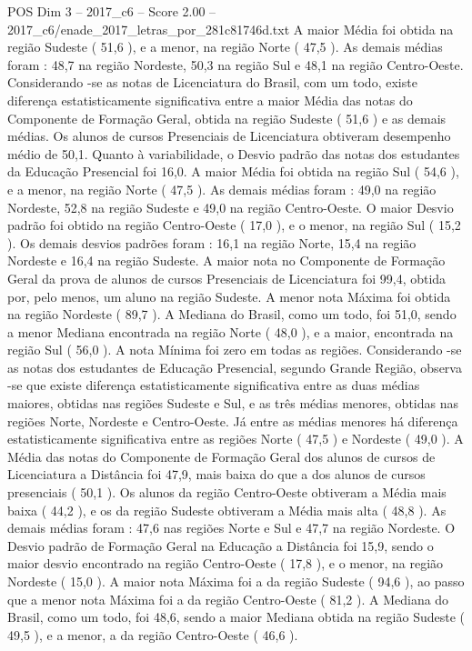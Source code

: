 \begin{textsample}{POS Dim 3 – 2017\_c6 – Score 2.00 – 2017\_c6/enade\_2017\_letras\_por\_281c81746d.txt}
A maior Média foi obtida na região Sudeste ( 51,6 ), e a menor, na região Norte ( 47,5 ).
As demais médias foram : 48,7 na região Nordeste, 50,3 na região Sul e 48,1 na região Centro-Oeste.
Considerando -se as notas de Licenciatura do Brasil, com um todo, existe diferença estatisticamente significativa entre a maior Média das notas do Componente de Formação Geral, obtida na região Sudeste ( 51,6 ) e as demais médias.
Os alunos de cursos Presenciais de Licenciatura obtiveram desempenho médio de 50,1.
Quanto à variabilidade, o Desvio padrão das notas dos estudantes da Educação Presencial foi 16,0.
A maior Média foi obtida na região Sul ( 54,6 ), e a menor, na região Norte ( 47,5 ).
As demais médias foram : 49,0 na região Nordeste, 52,8 na região Sudeste e 49,0 na região Centro-Oeste.
O maior Desvio padrão foi obtido na região Centro-Oeste ( 17,0 ), e o menor, na região Sul ( 15,2 ).
Os demais desvios padrões foram : 16,1 na região Norte, 15,4 na região Nordeste e 16,4 na região Sudeste.
A maior nota no Componente de Formação Geral da prova de alunos de cursos Presenciais de Licenciatura foi 99,4, obtida por, pelo menos, um aluno na região Sudeste.
A menor nota Máxima foi obtida na região Nordeste ( 89,7 ).
A Mediana do Brasil, como um todo, foi 51,0, sendo a menor Mediana encontrada na região Norte ( 48,0 ), e a maior, encontrada na região Sul ( 56,0 ).
A nota Mínima foi zero em todas as regiões.
Considerando -se as notas dos estudantes de Educação Presencial, segundo Grande Região, observa -se que existe diferença estatisticamente significativa entre as duas médias maiores, obtidas nas regiões Sudeste e Sul, e as três médias menores, obtidas nas regiões Norte, Nordeste e Centro-Oeste.
Já entre as médias menores há diferença estatisticamente significativa entre as regiões Norte ( 47,5 ) e Nordeste ( 49,0 ).
A Média das notas do Componente de Formação Geral dos alunos de cursos de Licenciatura a Distância foi 47,9, mais baixa do que a dos alunos de cursos presenciais ( 50,1 ).
Os alunos da região Centro-Oeste obtiveram a Média mais baixa ( 44,2 ), e os da região Sudeste obtiveram a Média mais alta ( 48,8 ).
As demais médias foram : 47,6 nas regiões Norte e Sul e 47,7 na região Nordeste.
O Desvio padrão de Formação Geral na Educação a Distância foi 15,9, sendo o maior desvio encontrado na região Centro-Oeste ( 17,8 ), e o menor, na região Nordeste ( 15,0 ).
A maior nota Máxima foi a da região Sudeste ( 94,6 ), ao passo que a menor nota Máxima foi a da região Centro-Oeste ( 81,2 ).
A Mediana do Brasil, como um todo, foi 48,6, sendo a maior Mediana obtida na região Sudeste ( 49,5 ), e a menor, a da região Centro-Oeste ( 46,6 ).

\end{textsample}

